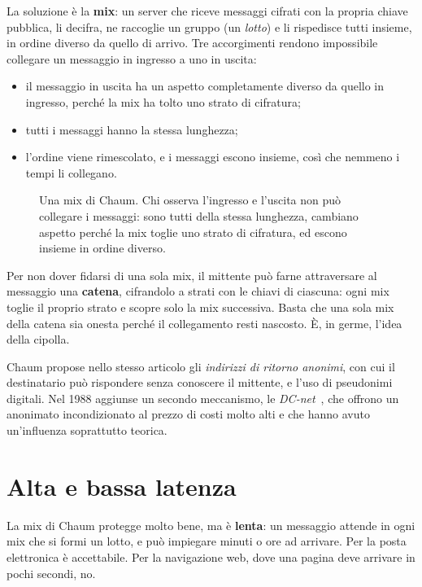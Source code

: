 La soluzione è la \textbf{mix}: un server che riceve messaggi cifrati con la propria chiave pubblica, li decifra, ne raccoglie un gruppo (un \emph{lotto}) e li rispedisce tutti insieme, in ordine diverso da quello di arrivo. Tre accorgimenti rendono impossibile collegare un messaggio in ingresso a uno in uscita:
\begin{itemize}
  \item il messaggio in uscita ha un aspetto completamente diverso da quello in ingresso, perché la mix ha tolto uno strato di cifratura;
  \item tutti i messaggi hanno la stessa lunghezza;
  \item l'ordine viene rimescolato, e i messaggi escono insieme, così che nemmeno i tempi li collegano.
\end{itemize}
\begin{figure}[htbp]
\centering

\caption{Una mix di Chaum. Chi osserva l'ingresso e l'uscita non può collegare i messaggi: sono tutti della stessa lunghezza, cambiano aspetto perché la mix toglie uno strato di cifratura, ed escono insieme in ordine diverso.}
\label{fig:mix}
\end{figure}

Per non dover fidarsi di una sola mix, il mittente può farne attraversare al messaggio una \textbf{catena}, cifrandolo a strati con le chiavi di ciascuna: ogni mix toglie il proprio strato e scopre solo la mix successiva. Basta che una sola mix della catena sia onesta perché il collegamento resti nascosto. È, in germe, l'idea della cipolla.

Chaum propose nello stesso articolo gli \emph{indirizzi di ritorno anonimi}, con cui il destinatario può rispondere senza conoscere il mittente, e l'uso di pseudonimi digitali. Nel 1988 aggiunse un secondo meccanismo, le \emph{DC-net}~\cite{chaum1988dining}, che offrono un anonimato incondizionato al prezzo di costi molto alti e che hanno avuto un'influenza soprattutto teorica.

\section{Alta e bassa latenza}\label{sec:radici-latenza}

La mix di Chaum protegge molto bene, ma è \textbf{lenta}: un messaggio attende in ogni mix che si formi un lotto, e può impiegare minuti o ore ad arrivare. Per la posta elettronica è accettabile. Per la navigazione web, dove una pagina deve arrivare in pochi secondi, no.

